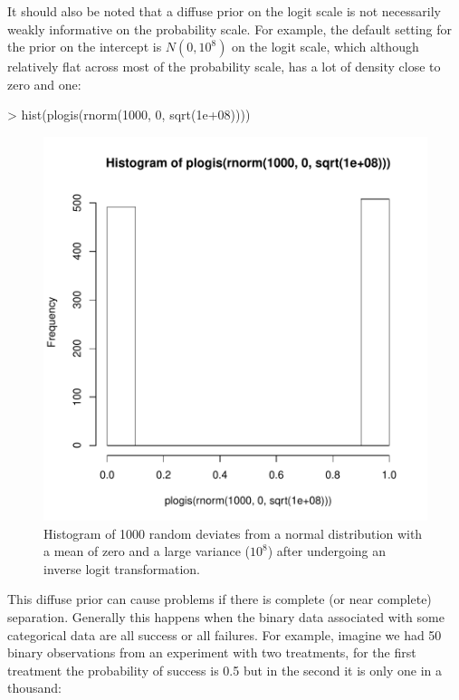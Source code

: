 \documentclass{article}
\begin{document}
It should also be noted that a diffuse prior on the logit scale is not necessarily weakly informative on the probability scale. For example, the default setting for the prior on the intercept is $N(0, 10^{8})$ on the logit scale, which although relatively flat across most of the probability scale, has a lot of density close to zero and one:


\begin{Schunk}
\begin{Sinput}
> hist(plogis(rnorm(1000, 0, sqrt(1e+08))))
\end{Sinput}
\end{Schunk}

\begin{figure}[!h]
\begin{center}
\includegraphics{Lecture2-074}
\end{center}
\caption{Histogram of 1000 random deviates from a normal distribution with a mean of zero and a large variance ($10^8$) after undergoing an inverse logit transformation.}
\label{invlogit-fig}
\end{figure}

This diffuse prior can cause problems if there is complete (or near complete) separation. Generally this happens when the binary data associated with some categorical data are all success or all failures. For example, imagine we had 50 binary observations from an experiment with two treatments, for the first treatment the probability of success is 0.5 but in the second it is only one in a thousand:
\end{document}
